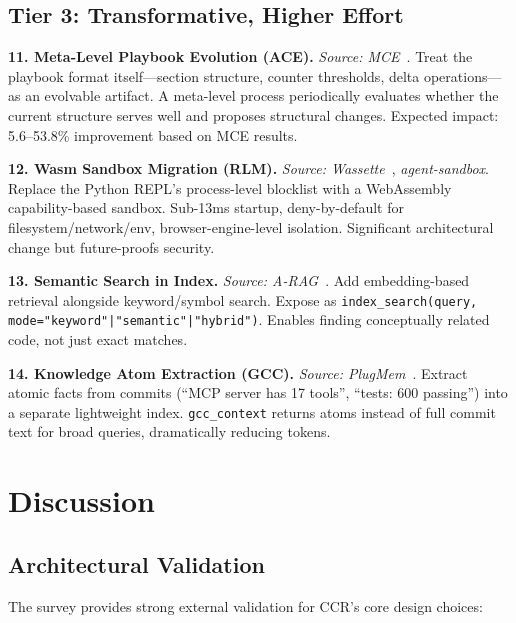 \documentclass[11pt]{article}
\begin{document}
\subsection{Tier 3: Transformative, Higher Effort}

\textbf{11. Meta-Level Playbook Evolution (ACE).} \textit{Source: MCE}~\cite{mce}. Treat the playbook format itself---section structure, counter thresholds, delta operations---as an evolvable artifact. A meta-level process periodically evaluates whether the current structure serves well and proposes structural changes. Expected impact: 5.6--53.8\% improvement based on MCE results.

\textbf{12. Wasm Sandbox Migration (RLM).} \textit{Source: Wassette}~\cite{wassette}, \textit{agent-sandbox}. Replace the Python REPL's process-level blocklist with a WebAssembly capability-based sandbox. Sub-13ms startup, deny-by-default for filesystem/network/env, browser-engine-level isolation. Significant architectural change but future-proofs security.

\textbf{13. Semantic Search in Index.} \textit{Source: A-RAG}~\cite{arag}. Add embedding-based retrieval alongside keyword/symbol search. Expose as \texttt{index\_search(query, mode="keyword"|"semantic"|"hybrid")}. Enables finding conceptually related code, not just exact matches.

\textbf{14. Knowledge Atom Extraction (GCC).} \textit{Source: PlugMem}~\cite{plugmem}. Extract atomic facts from commits (``MCP server has 17 tools'', ``tests: 600 passing'') into a separate lightweight index. \texttt{gcc\_context} returns atoms instead of full commit text for broad queries, dramatically reducing tokens.

\section{Discussion}
\label{sec:discussion}

\subsection{Architectural Validation}

The survey provides strong external validation for CCR's core design choices:
\end{document}
